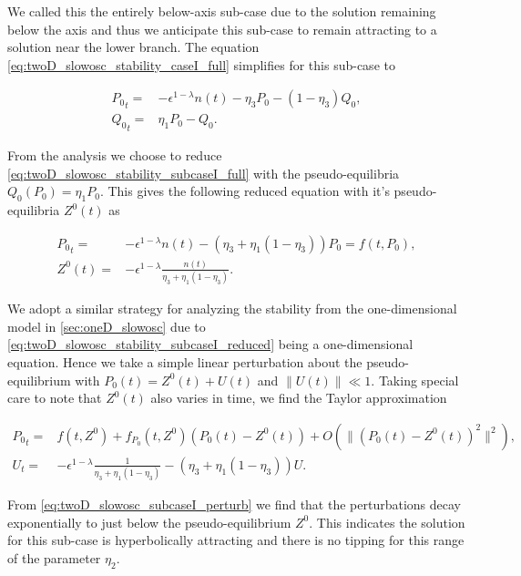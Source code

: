 We called this the entirely below-axis sub-case due to the solution remaining below the axis and thus we anticipate this sub-case to remain attracting to a solution near the lower branch. The equation \eqref{eq:twoD_slowosc_stability_caseI_full} simplifies for this sub-case to

\begin{equation}\label{eq:twoD_slowosc_stability_subcaseI_full}
\begin{aligned}
{P_0}_t =& -\epsilon^{1-\lambda} n(t)-\eta_3 P_0 -(1-\eta_3)Q_0,\\
{Q_0}_t =& \eta_1 P_0 - Q_0.
\end{aligned}
\end{equation}

From the analysis we choose to reduce \eqref{eq:twoD_slowosc_stability_subcaseI_full} with the pseudo-equilibria $Q_0(P_0)=\eta_1 P_0$. This gives the following reduced equation with it's pseudo-equilibria $Z^0(t)$ as 

\begin{equation}\label{eq:twoD_slowosc_stability_subcaseI_reduced}
\begin{aligned}
{P_0}_t =& -\epsilon^{1-\lambda}n(t)-(\eta_3+\eta_1(1-\eta_3))P_0=f(t,P_0),\\ Z^0(t) =& -\epsilon^{1-\lambda}\frac{n(t)}{\eta_3+\eta_1(1-\eta_3)}.
\end{aligned}
\end{equation}

We adopt a similar strategy for analyzing the stability from the one-dimensional model in \autoref{sec:oneD_slowosc} due to \eqref{eq:twoD_slowosc_stability_subcaseI_reduced} being a one-dimensional equation. Hence we take a simple linear perturbation about the pseudo-equilibrium with $P_0(t)=Z^0(t)+U(t)$ and $\lVert U(t)\rVert \ll 1$. Taking special care to note that $Z^0(t)$ also varies in time, we find the Taylor approximation

\begin{equation}\label{eq:twoD_slowosc_subcaseI_perturb}
\begin{aligned}
{P_0}_t=&f(t,Z^0) +f_{P_0}(t,Z^0)(P_0(t)-Z^0(t))+O(\lVert (P_0(t)-Z^0(t))^2\rVert^2),\\
U_t =& -\epsilon^{1-\lambda}\frac{1}{\eta_3+\eta_1(1-\eta_3)}-(\eta_3+\eta_1(1-\eta_3))U.
\end{aligned}
\end{equation}

From \eqref{eq:twoD_slowosc_subcaseI_perturb} we find that the perturbations decay exponentially to just below the pseudo-equilibrium $Z^0$. This indicates the solution for this sub-case is hyperbolically attracting and there is no tipping for this range of the parameter $\eta_2$.

